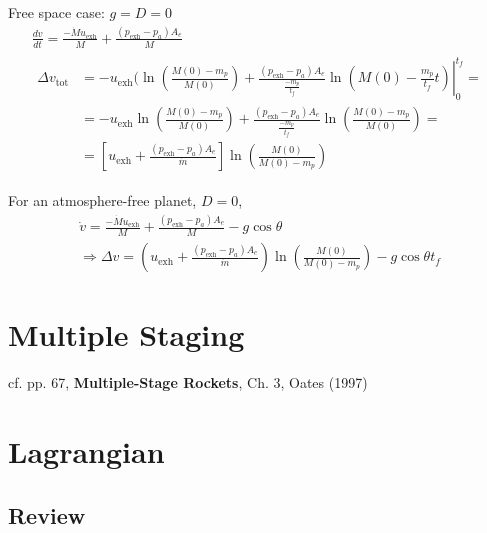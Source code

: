 \documentclass[10pt]{amsart}
\begin{document}
\begin{multicols*}{2}
Free space case: $g=D=0$ 
\[
\begin{gathered}
\frac{dv}{dt} = \frac{- \dot{M} u_{\text{exh} } }{ M }  + \frac{(p_{\text{exh} } - p_a ) A_e }{M} \\ \begin{aligned}
  \Delta v_{\text{tot}} & = -u_{\text{exh}} ( \ln{ \left( \frac{M(0) - m_p }{M(0) } \right) } + \left. \frac{ (p_{\text{exh}} - p_a)A_e }{ \frac{-m_p}{t_f} } \ln{ \left( M(0) - \frac{m_p}{t_f} t \right) } \right|_0^{t_f} = \\
  & = -u_{\text{exh}} \ln{ \left( \frac{M(0) - m_p }{M(0) } \right) } + \frac{ (p_{\text{exh} } - p_a )A_e }{ \frac{-m_p}{t_f} } \ln{ \left( \frac{M(0) - m_p }{ M(0) } \right) } =  \\
  & = \left[ u_{\text{exh}} + \frac{ (p_{\text{exh}} - p_a )A_e }{\dot{m}} \right] \ln{ \left( \frac{M(0)}{ M(0) - m_p } \right) }
\end{aligned}
\end{gathered}
\]

For an atmosphere-free planet, $D=0$, 
\[
\begin{gathered}
  \dot{v} = \frac{-\dot{M} u_{\text{exh} } }{M} + \frac{ (p_{\text{exh}} - p_a )A_e }{ M} - g\cos{\theta} \\
  \Longrightarrow \Delta v= \left( u_{\text{exh}} + \frac{ (p_{\text{exh}} - p_a ) A_e }{\dot{m}} \right) \ln{ \left( \frac{M(0) }{ M(0) - m_p } \right) } - g\cos{\theta}t_f
\end{gathered}
\]





\section{Multiple Staging}

cf. pp. 67, \textbf{Multiple-Stage Rockets}, Ch. 3, Oates (1997) \cite{GOates1997}

\section{Lagrangian}

\subsection{Review}





\end{multicols*}
\end{document}
